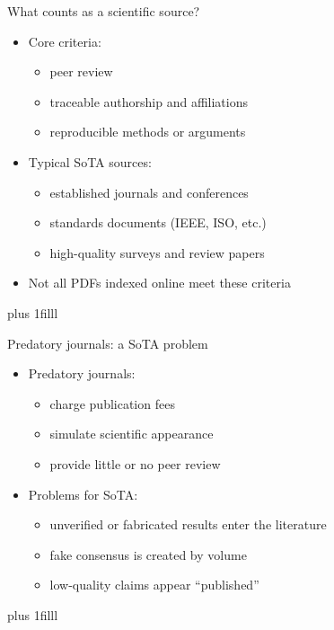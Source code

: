 \documentclass[aspectratio=169]{beamer}
\newcommand{\btVFill}{\vskip0pt plus 1filll}
\begin{document}
\begin{frame}{What counts as a scientific source?}
  \begin{itemize}
    \item Core criteria:
      \begin{itemize}
        \item peer review
        \item traceable authorship and affiliations
        \item reproducible methods or arguments
      \end{itemize}
    \item Typical SoTA sources:
      \begin{itemize}
        \item established journals and conferences
        \item standards documents (IEEE, ISO, etc.)
        \item high-quality surveys and review papers
      \end{itemize}
    \item Not all PDFs indexed online meet these criteria
  \end{itemize}
\btVFill
\end{frame}

\begin{frame}{Predatory journals: a SoTA problem}
  \begin{itemize}
    \item Predatory journals:
      \begin{itemize}
        \item charge publication fees
        \item simulate scientific appearance
        \item provide little or no peer review
      \end{itemize}
\item Problems for SoTA:
      \begin{itemize}
        \item unverified or fabricated results enter the literature
        \item fake consensus is created by volume
        \item low-quality claims appear ``published''
      \end{itemize}
  \end{itemize}
\btVFill
\end{frame}
\end{document}

